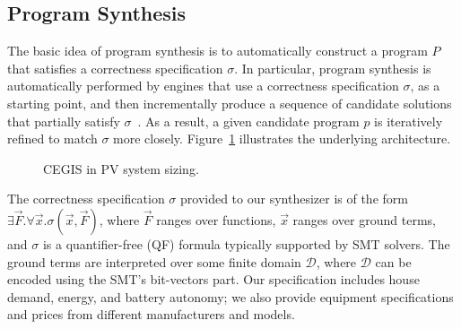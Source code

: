 \documentclass[runningheads]{llncs}
\begin{document}
\subsection{Program Synthesis}
\label{sec:ProgramSynthesis}
The basic idea of program synthesis is to automatically construct a program $P$ that satisfies a correctness specification $\sigma$. In particular, program synthesis is automatically performed by engines that use a correctness specification $\sigma$, as a starting point, and then incrementally produce a sequence of candidate solutions that partially satisfy $\sigma$~\cite{Abateetal2017}. As a result, a given candidate program $p$ is iteratively refined to match $\sigma$ more closely. Figure~\ref{Counter-Example-Guided-Inductive-Synthesis} illustrates the underlying architecture. 

\begin{figure}[h]
\begin{center}
\end{center}
%
	\caption{CEGIS in PV system sizing.}
	\label{Counter-Example-Guided-Inductive-Synthesis}
\end{figure}

The correctness specification $\sigma$ provided to our synthesizer is of the form $\exists \vec{F}. \forall \vec{x}. \sigma(\vec{x}, \vec{F})$, where $\vec{F}$ ranges over functions, $\vec{x}$ ranges over ground terms, and $\sigma$ is a quantifier-free (QF) formula typically supported by SMT solvers. The ground terms are interpreted over some finite domain $\mathcal{D}$, where $\mathcal{D}$ can be encoded using the SMT's bit-vectors part. Our specification includes house demand, energy, and battery autonomy; we also provide equipment specifications and prices from different manufacturers and models.
\end{document}

